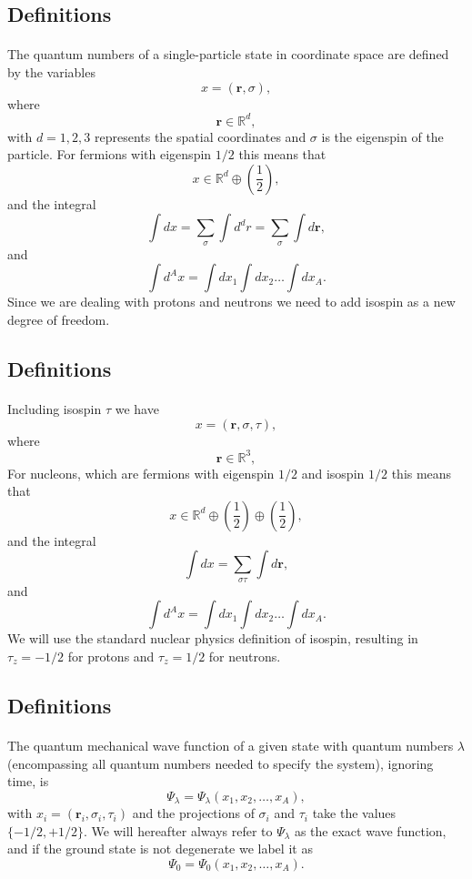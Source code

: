 \documentclass[%
twoside,                 %
final,                   %
10pt]{article}
\begin{document}
\subsection*{Definitions}

\paragraph{}
The quantum numbers of a single-particle state in coordinate space are
defined by the variables 
\[
x=(\bm{r},\sigma), 
\]
where 
\[
\bm{r}\in {\mathbb{R}}^{d},
\]
with $d=1,2,3$ represents the spatial coordinates and $\sigma$ is the eigenspin of the particle. For fermions with eigenspin $1/2$ this means that
\[
 x\in {\mathbb{R}}^{d}\oplus (\frac{1}{2}),
\]
and the integral
\[
\int dx = \sum_{\sigma}\int d^dr = \sum_{\sigma}\int d\bm{r},
\]
and
\[
\int d^Ax= \int dx_1\int dx_2\dots\int dx_A.
\]
Since we are dealing with protons and neutrons we need to add isospin as a new degree of freedom.




\subsection*{Definitions}

\paragraph{}
Including isospin $\tau$ we have 
\[
x=(\bm{r},\sigma,\tau), 
\]
where 
\[
\bm{r}\in {\mathbb{R}}^{3},
\]
For nucleons, which are fermions with eigenspin $1/2$ and isospin $1/2$ this means that
\[
 x\in {\mathbb{R}}^{d}\oplus (\frac{1}{2})\oplus (\frac{1}{2}),
\]
and the integral
\[
\int dx = \sum_{\sigma\tau}\int d\bm{r},
\]
and
\[
\int d^Ax= \int dx_1\int dx_2\dots\int dx_A.
\]
We will use the standard nuclear physics definition of isospin, resulting in $\tau_z=-1/2$ for protons and $\tau_z=1/2$ for neutrons.






\subsection*{Definitions}

\paragraph{}
The quantum mechanical wave function of a given state with quantum numbers $\lambda$ (encompassing all quantum numbers needed to specify the system), ignoring time, is
\[
\Psi_{\lambda}=\Psi_{\lambda}(x_1,x_2,\dots,x_A),
\]
with $x_i=(\bm{r}_i,\sigma_i,\tau_i)$ and the projections of $\sigma_i$ and $\tau_i$ take the values
$\{-1/2,+1/2\}$. 
We will hereafter always refer to $\Psi_{\lambda}$ as the exact wave function, and if the ground state is not degenerate we label it as 
\[
\Psi_0=\Psi_0(x_1,x_2,\dots,x_A).
\]
\end{document}
